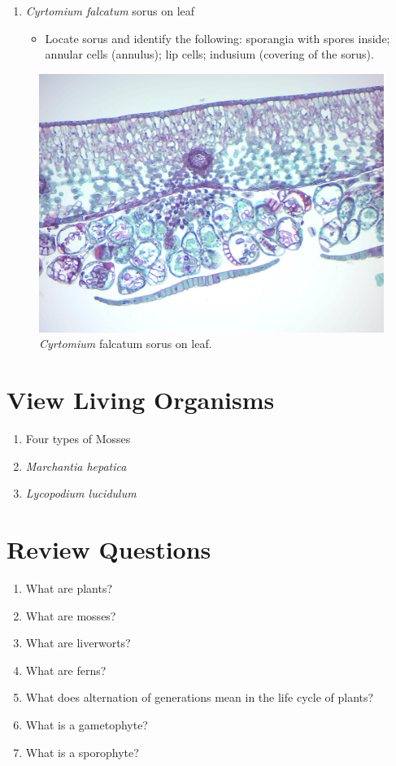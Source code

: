 \begin{enumerate}
\def\labelenumi{\arabic{enumi}.}
\tightlist
\item
  \emph{Cyrtomium falcatum} sorus on leaf

  \begin{itemize}
  \tightlist
  \item
    Locate sorus and identify the following: sporangia with spores
    inside; annular cells (annulus); lip cells; indusium (covering of
    the sorus).
  \end{itemize}
\end{enumerate}

\begin{figure}

{\centering \includegraphics[width=0.7\linewidth]{./figures/mosses/cyrtomium_sorus}

}

\caption{\emph{Cyrtomium} falcatum sorus on leaf.}\label{fig:cyrtomium}
\end{figure}

\section{View Living Organisms}\label{view-living-organisms-1}

\begin{enumerate}
\def\labelenumi{\arabic{enumi}.}
\tightlist
\item
  Four types of Mosses
\item
  \emph{Marchantia hepatica}
\item
  \emph{Lycopodium lucidulum}
\end{enumerate}

\section{Review Questions}\label{review-questions-1}

\begin{enumerate}
\def\labelenumi{\arabic{enumi}.}
\tightlist
\item
  What are plants?
\item
  What are mosses?
\item
  What are liverworts?
\item
  What are ferns?
\item
  What does alternation of generations mean in the life cycle of plants?
\item
  What is a gametophyte?
\item
  What is a sporophyte?
\end{enumerate}
